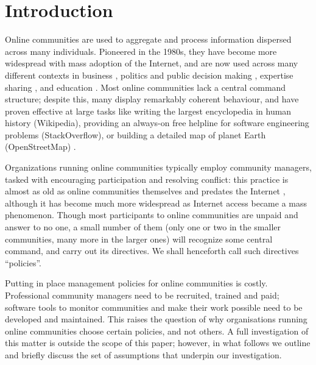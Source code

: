 \section{Introduction}

Online communities are used to aggregate and process information dispersed across many individuals. Pioneered in the 1980s, they have become more widespread with mass adoption of the Internet, and are now used across many different contexts in business \cite{mcwilliam2012building, tapscott2008wikinomics}, politics and public decision making \cite{rheingold1993virtual, noveck2009wiki, cottica2010wikicrazia}, expertise sharing \cite{rheingold1993virtual, zhang2007expertise, shirky2008here}, and education \cite{milligan2013patterns}. Most online communities lack a central command structure; despite this, many display remarkably coherent behaviour, and have proven effective at large tasks like writing the largest encyclopedia in human history (Wikipedia), providing an always-on free helpline for software engineering problems (StackOverflow), or building a detailed map of planet Earth (OpenStreetMap) \cite{shirky2008here}. 

Organizations running online communities typically employ community managers, tasked with encouraging participation and resolving conflict: this practice is almost as old as online communities themselves and predates the Internet \cite{rheingold1993virtual}, although it has become much more widespread as Internet access became a mass phenomenon. Though most participants to online communities are unpaid and answer to no one, a small number of them (only one or two in the smaller communities, many more in the larger ones) will recognize some central command, and carry out its directives. We shall henceforth call such directives “policies”. 

Putting in place management policies for online communities is costly. Professional community managers need to be recruited, trained and paid; software tools to monitor communities and make their work possible need to be developed and maintained. This raises the question of why organisations running online communities choose certain policies, and not others. A full investigation of this matter is outside the scope of this paper; however, in what follows we outline and briefly discuss the set of assumptions that underpin our investigation. 

